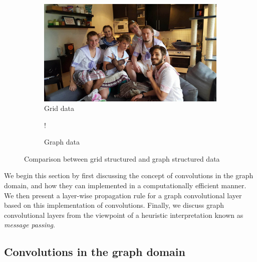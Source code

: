 \begin{figure}
    \centering
        \begin{subfigure}{.5\textwidth}
            \centering
            \includegraphics[width=.9\linewidth]{chapters/images_theory/placeholder.jpg}
            \caption{Grid data}
            \label{fig:grid_data}
        \end{subfigure}%
        \begin{subfigure}{.5\textwidth}
            \begin{center}
                 {!} {
                    
                }
            \end{center}
            \caption{Graph data}
            \label{fig:graph_dad}
        \end{subfigure}
    \caption{Comparison between grid structured and graph structured data }
    \label{fig:grid_graph_data}
\end{figure}

We begin this section by first discussing the concept of convolutions in the graph domain, and how they can implemented in a computationally efficient manner. We then present a layer-wise propagation rule for a graph convolutional layer based on this implementation of convolutions. Finally, we discuss graph convolutional layers from the viewpoint of a heuristic interpretation known as \textit{message passing}.

\subsection{Convolutions in the graph domain}

